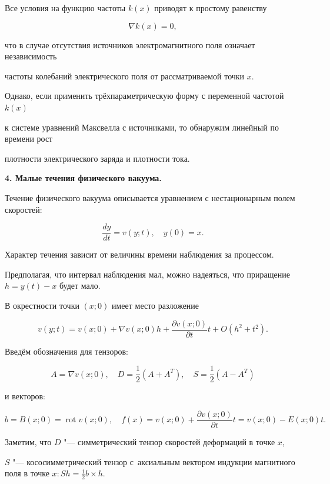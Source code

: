 Все условия на функцию частоты $k(x)$ приводят к простому равенству 

$$\nabla k(x) = 0,$$ 

что в случае отсутствия источников электромагнитного поля означает независимость 

частоты колебаний электрического поля от рассматриваемой точки $x$.



Однако, если применить трёхпараметрическую форму с переменной частотой $k(x)$ 

к системе уравнений Максвелла с источниками, то обнаружим линейный по времени рост 

плотности электрического заряда и плотности тока.

 

\smallskip 

 

{\bf 4. Малые течения физического вакуума.} 

Течение физического вакуума описывается уравнением с нестационарным полем скоростей: 

$$

\frac{dy}{dt} = v(y;t),\quad y(0) = x.

$$ 

Характер течения зависит от величины времени наблюдения за процессом. 

Предполагая, что интервал наблюдения мал, можно надеяться, что приращение $h = y(t) - x$ будет мало. 

В окрестности точки $(x;0)$ имеет место разложение

$$

v(y;t) = v(x;0) + \nabla v(x;0)h + \frac{\partial v(x;0)}{\partial t}t + O(h^2 + t^2).

$$

Введём обозначения для тензоров:

$$

A = \nabla v(x;0),\quad D = \frac{1}{2}(A + A^T),\quad  S = \frac{1}{2}(A - A^T)

$$ 

и векторов: 

$$

b= B(x;0) = \mathop{\mathrm{rot}} v(x;0),\quad  f(x) = v(x;0) + \frac{\partial v(x;0)}{\partial t}t =  v(x;0) - E(x;0)t.

$$

Заметим, что $D$ "--- симметрический тензор скоростей деформаций в точке $x$, 

$S$ "--- кососимметрический тензор  с~аксиальным вектором индукции магнитного поля в точке $x : Sh = \frac{1}{2}b\times h$. 

